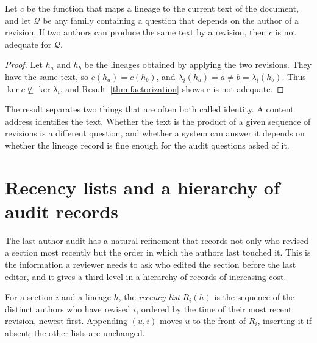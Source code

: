 \begin{newresult}\label{prop:content-not-lineage}
Let $c$ be the function that maps a lineage to the current text of the document, and let $\mathcal Q$ be any family containing a question that depends on the author of a revision. If two authors can produce the same text by a revision, then $c$ is not adequate for $\mathcal Q$.
\end{newresult}
\begin{proof}
Let $h_a$ and $h_b$ be the lineages obtained by applying the two revisions. They have the same text, so $c(h_a)=c(h_b)$, and $\lambda_i(h_a)=a\ne b=\lambda_i(h_b)$. Thus $\ker c\not\subseteq\ker\lambda_i$, and Result~\ref{thm:factorization} shows $c$ is not adequate.
\end{proof}

The result separates two things that are often both called identity. A content address identifies the text. Whether the text is the product of a given sequence of revisions is a different question, and whether a system can answer it depends on whether the lineage record is fine enough for the audit questions asked of it.


\section{Recency lists and a hierarchy of audit records}\label{sec:recency}

The last-author audit has a natural refinement that records not only who revised a section most recently but the order in which the authors last touched it. This is the information a reviewer needs to ask who edited the section before the last editor, and it gives a third level in a hierarchy of records of increasing cost.

For a section $i$ and a lineage $h$, the \emph{recency list} $R_i(h)$ is the sequence of the distinct authors who have revised $i$, ordered by the time of their most recent revision, newest first. Appending $(u,i)$ moves $u$ to the front of $R_i$, inserting it if absent; the other lists are unchanged.

